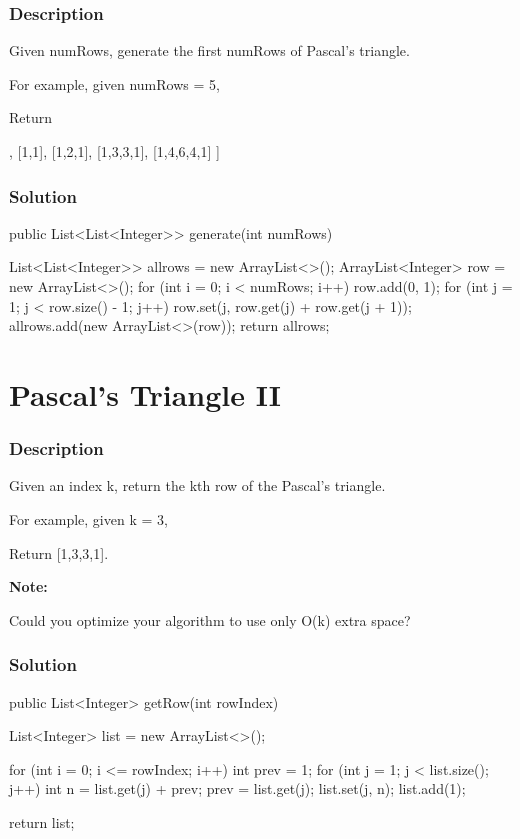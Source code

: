 \subsubsection{Description}
Given numRows, generate the first numRows of Pascal's triangle.

For example, given numRows = 5,

Return
\begin{Code}
[
     [1],
    [1,1],
   [1,2,1],
  [1,3,3,1],
 [1,4,6,4,1]
]
\end{Code}
\subsubsection{Solution}

\begin{Code}
public List<List<Integer>> generate(int numRows) {
    List<List<Integer>> allrows = new ArrayList<>();
    ArrayList<Integer> row = new ArrayList<>();
    for (int i = 0; i < numRows; i++) {
        row.add(0, 1);
        for (int j = 1; j < row.size() - 1; j++)
            row.set(j, row.get(j) + row.get(j + 1));
        allrows.add(new ArrayList<>(row));
    }
    return allrows;

}
\end{Code}

\newpage

\section{Pascal's Triangle II} %

\subsubsection{Description}
Given an index k, return the kth row of the Pascal's triangle.

For example, given k = 3,

Return [1,3,3,1].

\textbf{Note:}

Could you optimize your algorithm to use only O(k) extra space?

\subsubsection{Solution}

\begin{Code}
public List<Integer> getRow(int rowIndex) {
    List<Integer> list = new ArrayList<>();

    for (int i = 0; i <= rowIndex; i++) {
        int prev = 1;
        for (int j = 1; j < list.size(); j++) {
            int n = list.get(j) + prev;
            prev = list.get(j);
            list.set(j, n);
        }
        list.add(1);
    }

    return list;
}
\end{Code}

